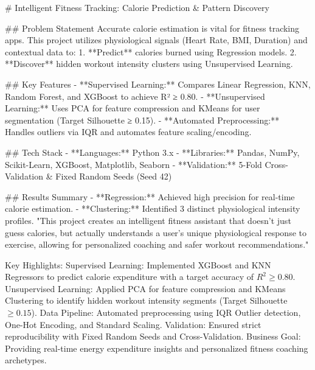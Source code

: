 # Intelligent Fitness Tracking: Calorie Prediction & Pattern Discovery

##  Problem Statement
Accurate calorie estimation is vital for fitness tracking apps. This project utilizes physiological signals (Heart Rate, BMI, Duration) and contextual data to:
1. **Predict** calories burned using Regression models.
2. **Discover** hidden workout intensity clusters using Unsupervised Learning.

##  Key Features
- **Supervised Learning:** Compares Linear Regression, KNN, Random Forest, and XGBoost to achieve R² ≥ 0.80.
- **Unsupervised Learning:** Uses PCA for feature compression and KMeans for user segmentation (Target Silhouette ≥ 0.15).
- **Automated Preprocessing:** Handles outliers via IQR and automates feature scaling/encoding.

## Tech Stack
- **Languages:** Python 3.x
- **Libraries:** Pandas, NumPy, Scikit-Learn, XGBoost, Matplotlib, Seaborn
- **Validation:** 5-Fold Cross-Validation & Fixed Random Seeds (Seed 42)

##  Results Summary
- **Regression:** Achieved high precision for real-time calorie estimation.
- **Clustering:** Identified 3 distinct physiological intensity profiles.
"This project creates an intelligent fitness assistant that doesn't just guess calories, but actually understands a user's unique physiological response to exercise, allowing for personalized coaching and safer workout recommendations."


Key Highlights:
Supervised Learning: 
	Implemented XGBoost and KNN Regressors to predict calorie expenditure with a target accuracy of $R^2 \geq 0.80$.
Unsupervised Learning: 
	Applied PCA for feature compression and KMeans Clustering to identify hidden workout intensity segments (Target Silhouette $\geq 0.15$).
Data Pipeline: 
	Automated preprocessing using IQR Outlier detection, One-Hot Encoding, and Standard Scaling.
Validation:
	Ensured strict reproducibility with Fixed Random Seeds and Cross-Validation.
Business Goal: 
	Providing real-time energy expenditure insights and personalized fitness coaching archetypes.
